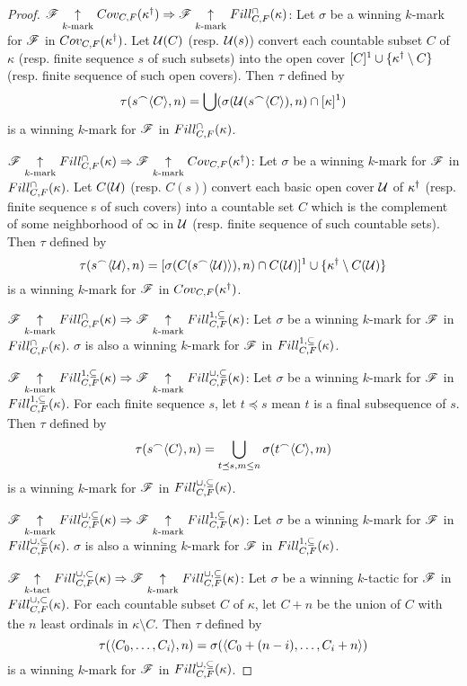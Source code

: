 \begin{proof}
  $\mathscr{F} \underset{k\text{-mark}}{\uparrow}Cov_{C,F}(\kappa^\dagger)
    \Rightarrow
  \mathscr{F} \underset{k\text{-mark}}{\uparrow}Fill^{\cap}_{C,F}(\kappa)$:
  Let $\sigma$ be a winning $k$-mark for $\mathscr{F}$ in
  $Cov_{C,F}(\kappa^\dagger)$. Let $\mathcal{U}(C)$ (resp. $\mathcal{U}(s)$) convert each
  countable subset $C$ of $\kappa$ (resp. finite sequence $s$ of such subsets)
  into the open cover $[C]^1\cup\{\kappa^\dagger\setminus C\}$
  (resp. finite sequence of such open covers). Then $\tau$ defined by
    \[
      \tau(s{^\frown}\langle C\rangle,n)
        =
      \bigcup(\sigma(\mathcal{U}(s{^\frown}\langle C\rangle),n)\cap[\kappa]^1)
    \]
  is a winning $k$-mark for $\mathscr{F}$ in $Fill^{\cap}_{C,F}(\kappa)$.

  $\mathscr{F} \underset{k\text{-mark}}{\uparrow}Fill^{\cap}_{C,F}(\kappa)
    \Rightarrow
  \mathscr{F} \underset{k\text{-mark}}{\uparrow}Cov_{C,F}(\kappa^\dagger)$:
  Let $\sigma$ be a winning $k$-mark for $\mathscr{F}$ in
  $Fill^{\cap}_{C,F}(\kappa)$. Let $C(\mathcal{U})$ (resp. $C(s)$) convert each basic open
  cover $\mathcal{U}$ of $\kappa^\dagger$ (resp. finite sequence s of such covers)
  into a countable set $C$ which is the complement of some neighborhood of
  $\infty$ in $\mathcal{U}$ (resp. finite sequence of such countable sets).
  Then $\tau$ defined by
    \[
      \tau(s{^\frown}\langle\mathcal{U}\rangle,n)
        =
      [\sigma(C(s{^\frown}\langle\mathcal{U})\rangle),n)\cap C(\mathcal{U})]^1
        \cup
      \{\kappa^\dagger\setminus C(\mathcal{U})\}
    \]
  is a winning $k$-mark for $\mathscr{F}$ in $Cov_{C,F}(\kappa^\dagger)$.

  $\mathscr{F} \underset{k\text{-mark}}{\uparrow}Fill^{\cap}_{C,F}(\kappa)
    \Rightarrow
  \mathscr{F} \underset{k\text{-mark}}{\uparrow}Fill^{1,\subseteq}_{C,F}(\kappa)$:
  Let $\sigma$ be a winning $k$-mark for $\mathscr{F}$ in
  $Fill^{\cap}_{C,F}(\kappa)$. $\sigma$ is also a winning $k$-mark for $\mathscr{F}$
  in $Fill^{1,\subseteq}_{C,F}(\kappa)$.

  $\mathscr{F} \underset{k\text{-mark}}{\uparrow}Fill^{1,\subseteq}_{C,F}(\kappa)
    \Rightarrow
  \mathscr{F} \underset{k\text{-mark}}{\uparrow}Fill^{\cup,\subseteq}_{C,F}(\kappa)$: Let $\sigma$ be a winning $k$-mark for $\mathscr{F}$ in
  $Fill^{1,\subseteq}_{C,F}(\kappa)$. For each finite sequence $s$, let $t\preceq s$ mean $t$
  is a final subsequence of $s$. Then $\tau$ defined by
    \[
      \tau(s{^\frown}\langle C\rangle,n)
        =
      \bigcup_{t\preceq s, m\leq n}
      \sigma(t{^\frown}\langle C\rangle,m)
    \]
  is a winning $k$-mark for $\mathscr{F}$ in $Fill^{\cup,\subseteq}_{C,F}(\kappa)$.

  $\mathscr{F} \underset{k\text{-mark}}{\uparrow}Fill^{\cup,\subseteq}_{C,F}(\kappa)
    \Rightarrow
  \mathscr{F} \underset{k\text{-mark}}{\uparrow}Fill^{1,\subseteq}_{C,F}(\kappa)$:
  Let $\sigma$ be a winning $k$-mark for $\mathscr{F}$ in
  $Fill^{\cup,\subseteq}_{C,F}(\kappa)$. $\sigma$ is also a winning $k$-mark for $\mathscr{F}$
  in $Fill^{1,\subseteq}_{C,F}(\kappa)$.

  $\mathscr{F} \underset{k\text{-tact}}{\uparrow}Fill^{\cup,\subset}_{C,F}(\kappa)
    \Rightarrow
  \mathscr{F} \underset{k\text{-mark}}{\uparrow}Fill^{\cup,\subseteq}_{C,F}(\kappa)$:
  Let $\sigma$ be a winning $k$-tactic for $\mathscr{F}$ in
  $Fill^{\cup,\subset}_{C,F}(\kappa)$. For each countable subset $C$ of $\kappa$, let $C+n$
  be the union of $C$ with the $n$ least ordinals in $\kappa\setminus C$.
  Then $\tau$ defined by
    \[
      \tau(\langle C_0,\dots,C_i\rangle,n)
        =
      \sigma(\langle C_0+(n-i),\dots,C_i+n\rangle)
    \]
  is a winning $k$-mark for $\mathscr{F}$ in $Fill^{\cup,\subseteq}_{C,F}(\kappa)$.
\end{proof}

